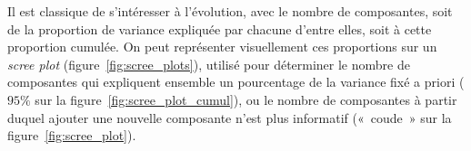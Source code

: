 Il est classique de s'intéresser à l'évolution, avec le nombre de composantes,
soit de la proportion de variance expliquée par chacune d'entre elles, soit à
cette proportion cumulée. On peut représenter visuellement ces proportions sur
un {\it scree plot} (figure~\ref{fig:scree_plots}), utilisé pour déterminer le
nombre de composantes qui expliquent ensemble un pourcentage de la variance
fixé a priori ($95\%$ sur la figure~\ref{fig:scree_plot_cumul}), ou le nombre
de composantes à partir duquel ajouter une nouvelle composante n'est plus
informatif («~coude~» sur la
figure~\ref{fig:scree_plot}). %


